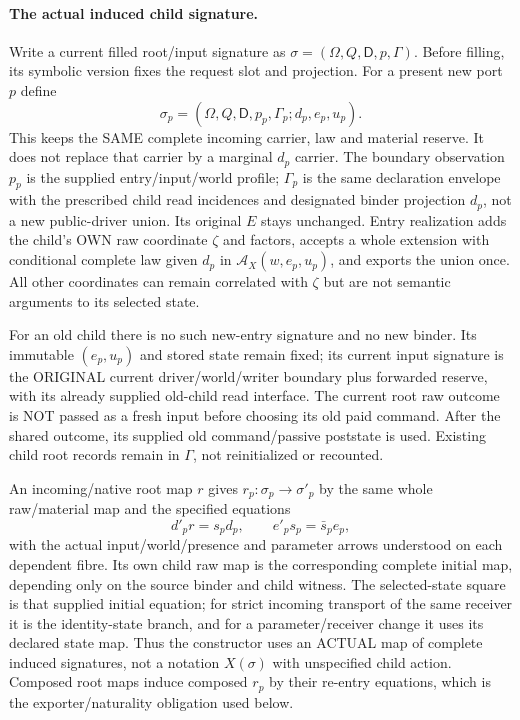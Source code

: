 \documentclass[11pt]{article}
\begin{document}
\paragraph{The actual induced child signature.}
Write a current filled root/input signature as $\sigma=(\Omega,Q,\mathsf D,p,\Gamma)$. Before filling, its symbolic version fixes the request slot and projection. For a present new port $p$ define
\[
 \sigma_p=(\Omega,Q,\mathsf D,p_p,\Gamma_p;d_p,e_p,u_p).       \tag{2}
\]
This keeps the SAME complete incoming carrier, law and material reserve. It does not replace that carrier by a marginal $d_p$ carrier. The boundary observation $p_p$ is the supplied entry/input/world profile; $\Gamma_p$ is the same declaration envelope with the prescribed child read incidences and designated binder projection $d_p$, not a new public-driver union. Its original $E$ stays unchanged. Entry realization adds the child's OWN raw coordinate $\zeta$ and factors, accepts a whole extension with conditional complete law given $d_p$ in $\mathcal A_X(w,e_p,u_p)$, and exports the union once. All other coordinates can remain correlated with $\zeta$ but are not semantic arguments to its selected state.

For an old child there is no such new-entry signature and no new binder. Its immutable $(e_p,u_p)$ and stored state remain fixed; its current input signature is the ORIGINAL current driver/world/writer boundary plus forwarded reserve, with its already supplied old-child read interface. The current root raw outcome is NOT passed as a fresh input before choosing its old paid command. After the shared outcome, its supplied old command/passive poststate is used. Existing child root records remain in $\Gamma$, not reinitialized or recounted.

An incoming/native root map $r$ gives $r_p:\sigma_p\to\sigma'_p$ by the same whole raw/material map and the specified equations
\[
 d'_p r=s_p d_p,\qquad
 e'_p s_p=\bar s_p e_p,
\]
with the actual input/world/presence and parameter arrows understood on each dependent fibre. Its own child raw map is the corresponding complete initial map, depending only on the source binder and child witness. The selected-state square is that supplied initial equation; for strict incoming transport of the same receiver it is the identity-state branch, and for a parameter/receiver change it uses its declared state map. Thus the constructor uses an ACTUAL map of complete induced signatures, not a notation $X(\sigma)$ with unspecified child action. Composed root maps induce composed $r_p$ by their re-entry equations, which is the exporter/naturality obligation used below.
\end{document}
